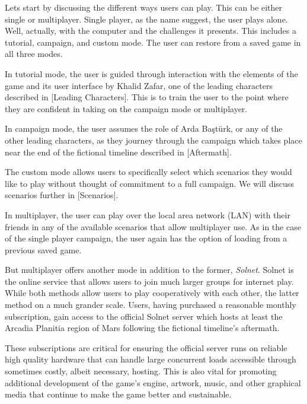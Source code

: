 

Lets start by discussing the different ways users can play. This can be either single or multiplayer. Single player, as the name suggest, the user plays alone. Well, actually, with the computer and the challenges it presents. This includes a tutorial, campaign, and custom mode. The user can restore from a saved game in all three modes.

In tutorial mode, the user is guided through interaction with the elements of the game and its user interface by Khalid Zafar, one of the leading characters described in [Leading Characters]. This is to train the user to the point where they are confident in taking on the campaign mode or multiplayer.

In campaign mode, the user assumes the role of Arda Baştürk, or any of the other leading characters, as they journey through the campaign which takes place near the end of the fictional timeline described in [Aftermath].

The custom mode allows users to specifically select which scenarios they would like to play without thought of commitment to a full campaign. We will discuss scenarios further in [Scenarios]. 

In multiplayer, the user can play over the local area network (LAN) with their friends in any of the available scenarios that allow multiplayer use. As in the case of the single player campaign, the user again has the option of loading from a previous saved game.

But multiplayer offers another mode in addition to the former, {\it Solnet}. Solnet is the online service that allows users to join much larger groups for internet play. While both methods allow users to play cooperatively with each other, the latter method on a much grander scale. Users, having purchased a reasonable monthly subscription, gain access to the official Solnet server which hosts at least the Arcadia Planitia region of Mars following the fictional timeline's aftermath. 

These subscriptions are critical for ensuring the official server runs on reliable high quality hardware that can handle large concurrent loads accessible through sometimes costly, albeit necessary, hosting. This is also vital for promoting additional development of the game's engine, artwork, music, and other graphical media that continue to make the game better and sustainable.

